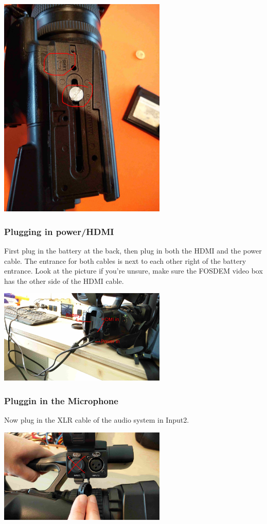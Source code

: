 \documentclass{article}
\begin{document}
\includegraphics[width = 80mm]{Cam00.jpg}

\subsubsection{Plugging in power/HDMI}
First plug in the battery at the back, then plug in both the HDMI and the power cable. The entrance for both cables is next to each other right of the battery entrance. Look at the picture if you're unsure, make sure the FOSDEM video box has the other side of the HDMI cable.

\includegraphics[width = 80mm]{Sony01.jpg}

\subsubsection{Pluggin in the Microphone}
Now plug in the XLR cable of the audio system in Input2.

\includegraphics[width = 80mm]{Sony02.jpg}
\end{document}
